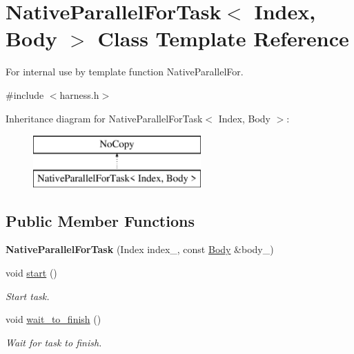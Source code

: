 \hypertarget{classNativeParallelForTask}{}\section{Native\+Parallel\+For\+Task$<$ Index, Body $>$ Class Template Reference}
\label{classNativeParallelForTask}


For internal use by template function Native\+Parallel\+For.  




{\ttfamily \#include $<$harness.\+h$>$}

Inheritance diagram for Native\+Parallel\+For\+Task$<$ Index, Body $>$\+:\begin{figure}[H]
\begin{center}
\leavevmode
\includegraphics[height=2.000000cm]{classNativeParallelForTask}
\end{center}
\end{figure}
\subsection*{Public Member Functions}
\begin{DoxyCompactItemize}
\item 
\hypertarget{classNativeParallelForTask_a36d7a3aa4d0ec0895caeefc3a3ba8718}{}{\bfseries Native\+Parallel\+For\+Task} (Index index\+\_\+, const \hyperlink{classBody}{Body} \&body\+\_\+)\label{classNativeParallelForTask_a36d7a3aa4d0ec0895caeefc3a3ba8718}

\item 
\hypertarget{classNativeParallelForTask_aa728bdd704432a7fc6aec116bbde52a9}{}void \hyperlink{classNativeParallelForTask_aa728bdd704432a7fc6aec116bbde52a9}{start} ()\label{classNativeParallelForTask_aa728bdd704432a7fc6aec116bbde52a9}

\begin{DoxyCompactList}\small\item\em Start task. \end{DoxyCompactList}\item 
\hypertarget{classNativeParallelForTask_aaa2319d8cf4c2dc9b475708081bc6239}{}void \hyperlink{classNativeParallelForTask_aaa2319d8cf4c2dc9b475708081bc6239}{wait\+\_\+to\+\_\+finish} ()\label{classNativeParallelForTask_aaa2319d8cf4c2dc9b475708081bc6239}

\begin{DoxyCompactList}\small\item\em Wait for task to finish. \end{DoxyCompactList}\end{DoxyCompactItemize}


